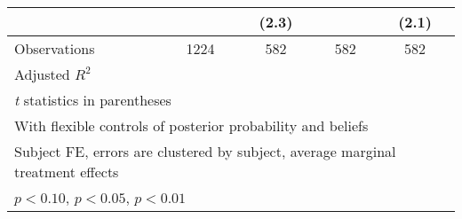 \begin{table}[htbp]
\begin{tabular}{l*{4}{c}}
                &                  &    (2.3)         &                  &    (2.1)         \\
\hline
Observations    &     1224         &      582         &      582         &      582         \\
Adjusted \(R^{2}\)&                  &                  &                  &                  \\
\hline\hline
\multicolumn{5}{l}{\footnotesize \textit{t} statistics in parentheses}\\
\multicolumn{5}{l}{\footnotesize With flexible controls of posterior probability and beliefs}\\
\multicolumn{5}{l}{\footnotesize Subject FE, errors are clustered by subject, average marginal treatment effects}\\
\multicolumn{5}{l}{\footnotesize \sym{*} \(p<0.10\), \sym{**} \(p<0.05\), \sym{***} \(p<0.01\)}\\
\end{tabular}
\end{table}
